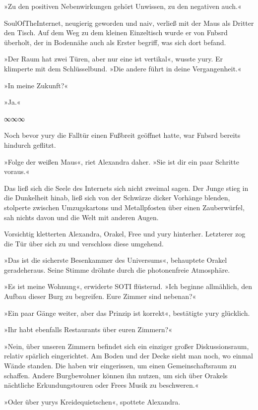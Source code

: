»Zu den positiven Nebenwirkungen gehört Unwissen, zu den negativen auch.«

SoulOfTheInternet, neugierig geworden und naiv, verließ mit der Maus als Dritter den Tisch. Auf dem Weg zu dem kleinen Einzeltisch wurde er von Fnbsrd überholt, der in Bodennähe auch als Erster begriff, was sich dort befand.

»Der Raum hat zwei Türen, aber nur eine ist vertikal«, wusste yury. Er klimperte mit dem Schlüsselbund. »Die andere führt in deine Vergangenheit.«

»In meine Zukunft?«

»Ja.«

\begin{center}
∞∞∞
\end{center}

Noch bevor yury die Falltür einen Fußbreit geöffnet hatte, war Fnbsrd bereits hindurch geflitzt.

»Folge der weißen Maus«, riet Alexandra daher. »Sie ist dir ein paar Schritte voraus.«

Das ließ sich die Seele des Internets sich nicht zweimal sagen. Der Junge stieg in die Dunkelheit hinab, ließ sich von der Schwärze dicker Vorhänge blenden, stolperte zwischen Umzugskartons und Metallpfosten über einen Zauberwürfel, sah nichts davon und die Welt mit anderen Augen.

Vorsichtig kletterten Alexandra, Orakel, Free und yury hinterher. Letzterer zog die Tür über sich zu und verschloss diese umgehend.

»Das ist die sicherste Besenkammer des Universums«, behauptete Orakel geradeheraus. Seine Stimme dröhnte durch die photonenfreie Atmosphäre.

»Es ist meine Wohnung«, erwiderte SOTI flüsternd. »Ich beginne allmählich, den Aufbau dieser Burg zu begreifen. Eure Zimmer sind nebenan?«

»Ein paar Gänge weiter, aber das Prinzip ist korrekt«, bestätigte yury glücklich.

»Ihr habt ebenfalls Restaurants über euren Zimmern?«

»Nein, über unseren Zimmern befindet sich ein einziger großer Diskussionsraum, relativ spärlich eingerichtet. Am Boden und der Decke sieht man noch, wo einmal Wände standen. Die haben wir eingerissen, um einen Gemeinschaftsraum zu schaffen. Andere Burgbewohner können ihn nutzen, um sich über Orakels nächtliche Erkundungstouren oder Frees Musik zu beschweren.«

»Oder über yurys Kreidequietschen«, spottete Alexandra.

